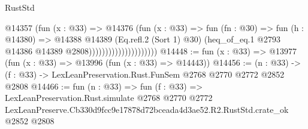 \begin{lexlean}{RustStd}
\begin{coremodule}
                                      @14357
                                        (fun (x : @33) =>
                                        @14376
                                          (fun (x : @33) =>
                                          fun (fn : @30) =>
                                          fun (h : @14380) =>
                                          @14388
                                            @14389
                                            (Eq.refl.{2} (Sort 1) @30)
                                            (heq_of_eq.{1}
                                              @2793
                                              @14386
                                              @14389
                                              @2808)))))))))))))))))))))
@14448 := fun (x : @33) => @13977 (fun (x : @33) => @13996 (fun (x : @33) => @14443))
@14456 := (n : @33) -> (f : @33) -> LexLeanPreservation.Rust.FunSem @2768 @2770 @2772 @2852 @2808
@14466 := fun (n : @33) =>
  fun (f : @33) =>
  LexLeanPreservation.Rust.simulate
    @2768
    @2770
    @2772
    LexLeanPreserve.Cb330d9fcc9e17878d72bceada4d3ae52.R2.RustStd.crate_ok
    @2852
    @2808
\end{coremodule}
\end{lexlean}
